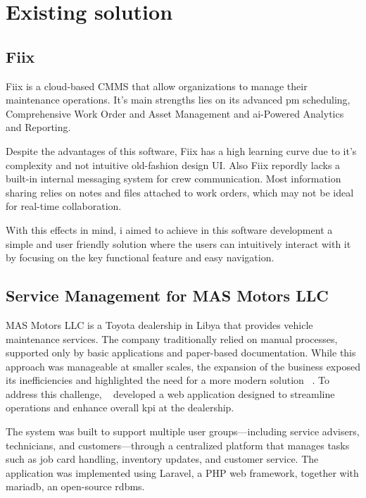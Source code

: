 \section{Existing solution}

\subsection{Fiix}
Fiix is a cloud-based \ac{CMMS} that allow organizations to manage their maintenance operations. 
It's main strengths lies on its advanced \acs{pm} scheduling, Comprehensive Work Order and Asset Management and \acs{ai}-Powered Analytics and Reporting. \cite{Doan_2025, Rockwell_Automation_2022}

Despite the advantages of this software, Fiix has a high learning curve due to it's complexity and not intuitive old-fashion design \acs{UI}. 
Also Fiix repordly lacks a built-in internal messaging system for crew communication.  Most information sharing relies on notes and files attached to work orders, which may not be ideal for real-time collaboration. \cite{Doan_2025}

With this effects in mind, i aimed to achieve in this software development a simple and user friendly solution where the users can intuitively interact with it by focusing on the key functional feature and easy navigation.

\subsection{Service Management for MAS Motors LLC}
MAS Motors LLC is a Toyota dealership in Libya that provides vehicle maintenance services. The company traditionally relied on manual processes, supported only by basic applications and paper-based documentation. While this approach was manageable at smaller scales, the expansion of the business exposed its inefficiencies and highlighted the need for a more modern solution ~\cite{MAS_MOTORS}. To address this challenge, ~\citet{MAS_MOTORS} developed a web application designed to streamline operations and enhance overall \acs{kpi} at the dealership.

The system was built to support multiple user groups—including service advisers, technicians, and customers—through a centralized platform that manages tasks such as job card handling, inventory updates, and customer service. The application was implemented using Laravel, a \acs{PHP}  web framework, together with \acs{mariadb}, an open-source \acs{rdbms}.

